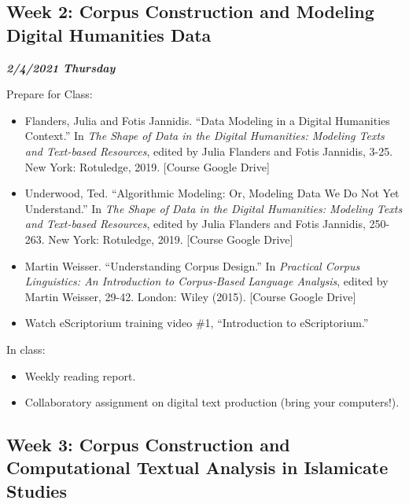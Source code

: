 \documentclass[
]{book}
\providecommand{\tightlist}{%
  \setlength{\itemsep}{0pt}\setlength{\parskip}{0pt}}
\begin{document}
\hypertarget{week-2-corpus-construction-and-modeling-digital-humanities-data}{%
\subsection{Week 2: Corpus Construction and Modeling Digital Humanities Data}\label{week-2-corpus-construction-and-modeling-digital-humanities-data}}

\textbf{\emph{2/4/2021 Thursday}}

Prepare for Class:

\begin{itemize}
\tightlist
\item
  Flanders, Julia and Fotis Jannidis. ``Data Modeling in a Digital Humanities Context.'' In \emph{The Shape of Data in the Digital Humanities: Modeling Texts and Text-based Resources}, edited by Julia Flanders and Fotis Jannidis, 3-25. New York: Rotuledge, 2019. {[}Course Google Drive{]}\\
\item
  Underwood, Ted. ``Algorithmic Modeling: Or, Modeling Data We Do Not Yet Understand.'' In \emph{The Shape of Data in the Digital Humanities: Modeling Texts and Text-based Resources}, edited by Julia Flanders and Fotis Jannidis, 250-263. New York: Rotuledge, 2019. {[}Course Google Drive{]}
\item
  Martin Weisser. ``Understanding Corpus Design.'' In \emph{Practical Corpus Linguistics: An Introduction to Corpus‐Based Language Analysis}, edited by Martin Weisser, 29-42. London: Wiley (2015). {[}Course Google Drive{]}
\item
  Watch eScriptorium training video \#1, ``Introduction to eScriptorium.''
\end{itemize}

In class:

\begin{itemize}
\tightlist
\item
  Weekly reading report.
\item
  Collaboratory assignment on digital text production (bring your computers!).
\end{itemize}

\hypertarget{week-3-corpus-construction-and-computational-textual-analysis-in-islamicate-studies}{%
\subsection{Week 3: Corpus Construction and Computational Textual Analysis in Islamicate Studies}\label{week-3-corpus-construction-and-computational-textual-analysis-in-islamicate-studies}}
\end{document}
